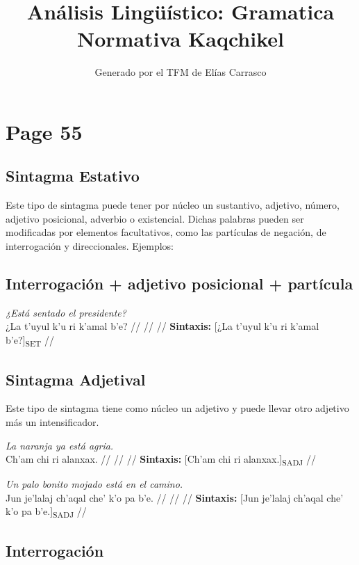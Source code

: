 \documentclass{article}%
\title{Análisis Lingüístico: Gramatica Normativa Kaqchikel}%
\author{Generado por el TFM de Elías Carrasco}%
\begin{document}
%
\normalsize%
\maketitle%
\section{Page 55}%
\label{sec:Page55}%
\subsection{Sintagma Estativo}%
\label{subsec:SintagmaEstativo}%

%
Este tipo de sintagma puede tener por núcleo un sustantivo, adjetivo, número, adjetivo %
posicional, adverbio o existencial. Dichas palabras pueden ser modificadas por %
elementos facultativos, como las partículas de negación, de interrogación y direccionales. %
Ejemplos: %
\subsection{Interrogación + adjetivo posicional + partícula}%
\label{subsec:Interrogacin+adjetivoposicional+partcula}%

%
\par\medskip%
\ex
\textit{¿Está sentado el presidente?} \\
\begingl
\gla ¿La t’uyul k’u ri k’amal b'e? //
\glb  //
\glc  //
\glft \textbf{Sintaxis:} [¿La t’uyul k’u ri k’amal b'e?]\textsubscript{SET} //
\endgl
\xe
%
\medskip%
\subsection{Sintagma Adjetival}%
\label{subsec:SintagmaAdjetival}%

%
Este tipo de sintagma tiene como núcleo un adjetivo y puede llevar otro adjetivo más un %
intensificador. %
\par\medskip%
\ex
\textit{La naranja ya está agria.} \\
\begingl
\gla Ch'am chi ri alanxax. //
\glb  //
\glc  //
\glft \textbf{Sintaxis:} [Ch'am chi ri alanxax.]\textsubscript{SADJ} //
\endgl
\xe
%
\medskip%
\par\medskip%
\ex
\textit{Un palo bonito mojado está en el camino.} \\
\begingl
\gla Jun je’lalaj ch’aqal che' k'o pa b'e. //
\glb  //
\glc  //
\glft \textbf{Sintaxis:} [Jun je’lalaj ch’aqal che' k'o pa b'e.]\textsubscript{SADJ} //
\endgl
\xe
%
\medskip%
\subsection{Interrogación}%
\label{subsec:Interrogacin}%
\end{document}
